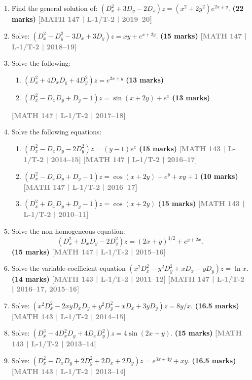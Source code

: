 \documentclass[12pt,a3paper]{article}
\newcommand{\yr}[1]{\hfill\textcolor{gray}{\small\textbf{[#1]}}}
\newcommand{\mk}[1]{\textcolor{orange!70!black}{\small\textbf{(#1 marks)}}}
\begin{document}
\begin{enumerate}
\item Find the general solution of: $(D_{x}^{2}+3D_{y}-2D_{x})z=(x^{2}+2y^{2})e^{2x+y}$.
\mk{22} \yr{MATH 147 | L-1/T-2 | 2019--20}


\item Solve: $(D_{x}^{2}-D_{y}^{2}-3D_{x}+3D_{y})z=xy+e^{x+2y}$.
\mk{15} \yr{MATH 147 | L-1/T-2 | 2018--19}


\item Solve the following:
\begin{enumerate}
  \item $(D_{x}^{2}+4D_{x}D_{y}+4D_{y}^{2})z=e^{2x+y}$ \mk{13}
  \item $(D_{x}^{2}-D_{x}D_{y}+D_{y}-1)z=\sin(x+2y)+e^{x}$ \mk{13}
\end{enumerate}
\yr{MATH 147 | L-1/T-2 | 2017--18}


\item Solve the following equations:
\begin{enumerate}
  \item $(D_{x}^{2}-D_{x}D_{y}-2D_{y}^{2})z=(y-1)e^{x}$ \mk{15} \yr{MATH 143 | L-1/T-2 | 2014--15} \yr{MATH 147 | L-1/T-2 | 2016--17}
  \item $(D_{x}^{2}-D_{x}D_{y}+D_{y}-1)z=\cos(x+2y)+e^{y}+xy+1$ \mk{10} \yr{MATH 147 | L-1/T-2 | 2016--17}
  \item $(D_{x}^{2}+D_{x}D_{y}+D_{y}-1)z=\cos(x+2y)$ \mk{15} \yr{MATH 143 | L-1/T-2 | 2010--11}
\end{enumerate}


\item Solve the non-homogeneous equation:
\[
(D_{x}^2+D_{x}D_{y}-2D_{y}^2)z=(2x+y)^{1/2}+e^{y+2x}.
\]
\mk{15} \yr{MATH 147 | L-1/T-2 | 2015--16}


\item Solve the variable-coefficient equation $(x^{2}D_{x}^{2}-y^{2}D_{y}^{2}+xD_{x}-yD_{y})z=\ln x$.
\mk{14} \yr{MATH 143 | L-1/T-2 | 2011--12} \yr{MATH 147 | L-1/T-2 | 2016--17, 2015--16}


\item Solve: $(x^{2}D_{x}^{2}-2xyD_{x}D_{y}+y^{2}D_{y}^{2}-xD_{x}+3yD_{y})z=8y/x$.
\mk{16.5} \yr{MATH 143 | L-1/T-2 | 2014--15}


\item Solve: $(D_{x}^{3}-4D_{x}^{2}D_{y}+4D_{x}D_{y}^{2})z=4\sin(2x+y)$.
\mk{15} \yr{MATH 143 | L-1/T-2 | 2013--14}


\item Solve: $(D_{x}^{2}-D_{x}D_{y}+2D_{y}^{2}+2D_{x}+2D_{y})z=e^{3x+4y}+xy$.
\mk{16.5} \yr{MATH 143 | L-1/T-2 | 2013--14}



\end{enumerate}
\end{document}
